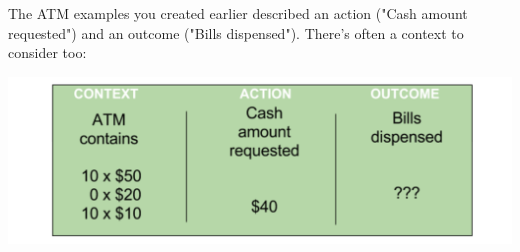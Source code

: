 \ifcontent

    The ATM examples you created earlier described an action ("Cash amount requested") and an outcome ("Bills dispensed"). There's often a context to consider too:
    
    \includegraphics[width=\textwidth]{images/atm-example-with-context}
    

\fi